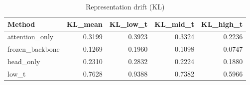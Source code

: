 \begin{table}[htbp]
\centering
\caption{Representation drift (KL)}
\label{tab:repr-drift}
\begin{tabular}{lrrrr}
\toprule
\textbf{Method} & \textbf{KL\_mean} & \textbf{KL\_low\_t} & \textbf{KL\_mid\_t} & \textbf{KL\_high\_t} \\
\midrule
attention\_only & 0.3199 & 0.3923 & 0.3324 & 0.2236 \\
frozen\_backbone & 0.1269 & 0.1960 & 0.1098 & 0.0747 \\
head\_only & 0.2310 & 0.2832 & 0.2224 & 0.1880 \\
low\_t & 0.7628 & 0.9388 & 0.7382 & 0.5966 \\
\bottomrule
\end{tabular}
\end{table}